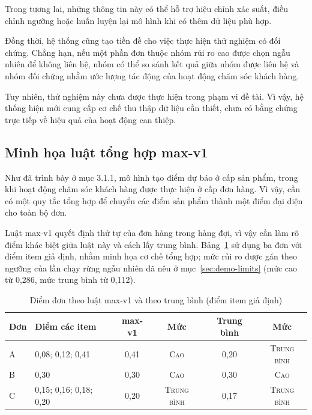 \documentclass[12pt,a4paper]{report}
\begin{document}
Trong tương lai, những thông tin này có thể hỗ trợ hiệu chỉnh xác suất, điều chỉnh ngưỡng hoặc huấn luyện lại mô hình khi có thêm dữ liệu phù hợp.

Đồng thời, hệ thống cũng tạo tiền đề cho việc thực hiện thử nghiệm có đối chứng. Chẳng hạn, nếu một phần đơn thuộc nhóm rủi ro cao được chọn ngẫu nhiên để không liên hệ, nhóm có thể so sánh kết quả giữa nhóm được liên hệ và nhóm đối chứng nhằm ước lượng tác động của hoạt động chăm sóc khách hàng.

Tuy nhiên, thử nghiệm này chưa được thực hiện trong phạm vi đề tài. Vì vậy, hệ thống hiện mới cung cấp cơ chế thu thập dữ liệu cần thiết, chưa có bằng chứng trực tiếp về hiệu quả của hoạt động can thiệp.

\FloatBarrier
\subsection{Minh họa luật tổng hợp max-v1}\label{sec:demo-maxv1}

Như đã trình bày ở mục 3.1.1, mô hình tạo điểm dự báo ở cấp sản phẩm, trong khi hoạt động chăm sóc khách hàng được thực hiện ở cấp đơn hàng. Vì vậy, cần có một quy tắc tổng hợp để chuyển các điểm sản phẩm thành một điểm đại diện cho toàn bộ đơn.

Luật max-v1 quyết định thứ tự của đơn hàng trong hàng đợi, vì vậy cần làm rõ điểm khác biệt giữa luật này và cách lấy trung bình. Bảng~\ref{tab:demo-maxv1} sử dụng ba đơn với điểm item giả định, nhằm minh họa cơ chế tổng hợp; mức rủi ro được gán theo ngưỡng của lần chạy rừng ngẫu nhiên đã nêu ở mục~\ref{sec:demo-limits} (mức cao từ 0,286, mức trung bình từ 0,112).

\begin{table}[htbp]\centering\small
\caption{Điểm đơn theo luật max-v1 và theo trung bình (điểm item giả định)}\label{tab:demo-maxv1}
\begin{tabular}{lp{3.4cm}cccc}
\toprule
Đơn & Điểm các item & max-v1 & Mức & Trung bình & Mức \\
\midrule
A & 0,08; 0,12; 0,41       & 0,41 & \textsc{Cao}        & 0,20 & \textsc{Trung bình} \\
B & 0,30                   & 0,30 & \textsc{Cao}        & 0,30 & \textsc{Cao} \\
C & 0,15; 0,16; 0,18; 0,20 & 0,20 & \textsc{Trung bình} & 0,17 & \textsc{Trung bình} \\
\bottomrule
\end{tabular}
\end{table}
\end{document}
